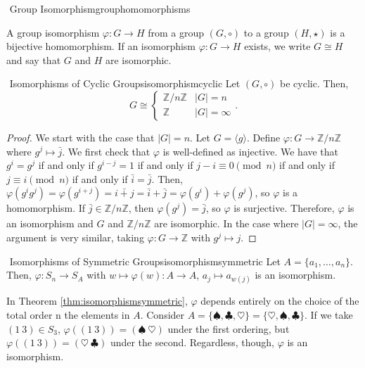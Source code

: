         \begin{definition}{\Stop\,\,Group Isomorphism}{grouphomomorphisms}

            A group isomorphism \(\varphi:G\to H\) from a group \((G,\circ)\) to a group \((H,\star)\) is a bijective homomorphism. If an isomorphism \(\varphi:G\to H\) exists, we write \(G\cong H\) and say that \(G\) and \(H\) are isomorphic.
            
        \end{definition}
        \begin{theorem}{\Stop\,\,Isomorphisms of Cyclic Groups}{isomorphismcyclic}
            Let \((G,\circ)\) be cyclic. Then,
            \begin{equation*}
                G\cong\begin{cases}
                    \mathbb{Z}/n\mathbb{Z} & |G|=n \\
                    \mathbb{Z} & |G|=\infty
                \end{cases}.
            \end{equation*}
            \begin{proof}
                We start with the case that \(|G|=n\). Let \(G=\langle g\rangle\). Define \(\varphi:G\to\mathbb{Z}/n\mathbb{Z}\) where \(g^j\mapsto\bar{j}\). We first check that \(\varphi\) is well-defined as injective. We have that \(g^i=g^j\) if and only if \(g^{i-j}=1\) if and only if \(j-i\equiv0\pmod n\) if and only if \(j\equiv i \pmod n\) if and only if \(\bar{i}=\bar{j}\). Then, \(\varphi(g^ig^j)=\varphi(g^{i+j})=\bar{i+j}=\bar{i}+\bar{j}=\varphi(g^i)+\varphi(g^j)\), so \(\varphi\) is a homomorphism. If \(\bar{j}\in\mathbb{Z}/n\mathbb{Z}\), then \(\varphi(g^j)=\bar{j}\), so \(\varphi\) is surjective. Therefore, \(\varphi\) is an isomorphism and \(G\) and \(\mathbb{Z}/n\mathbb{Z}\) are isomorphic. In the case where \(|G|=\infty\), the argument is very similar, taking \(\varphi:G\to\mathbb{Z}\) with \(g^j\mapsto j\).
            \end{proof}
        \end{theorem}
        \begin{theorem}{\Stop\,\,Isomorphisms of Symmetric Groups}{isomorphismsymmetric}
            Let \(A=\{a_1,\ldots,a_n\}\). Then, \(\varphi:S_n\to S_A\) with \(w\mapsto\varphi(w):A\to A\), \(a_j\mapsto a_{w(j)}\) is an isomorphism.
        \end{theorem}
        \begin{remark*}
            In Theorem \ref{thm:isomorphismsymmetric}, \(\varphi\) depends entirely on the choice of the total order n the elements in \(A\). Consider \(A=\{\spadesuit,\clubsuit,\heartsuit\}=\{\heartsuit,\spadesuit,\clubsuit\}\). If we take \((1\ 3)\in S_3\), \(\varphi((1\ 3))=(\spadesuit\ \heartsuit)\) under the first ordering, but \(\varphi((1\ 3))=(\heartsuit\ \clubsuit)\) under the second. Regardless, though, \(\varphi\) is an isomorphism.
        \end{remark*}

